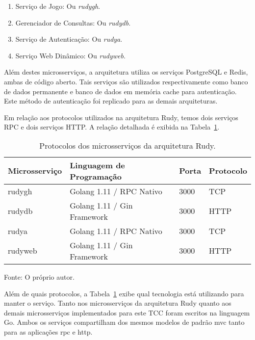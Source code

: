 \begin{enumerate}
    \item Serviço de Jogo: Ou \textit{rudygh}.
    \item Gerenciador de Consultas: Ou \textit{rudydb}.
    \item Serviço de Autenticação: Ou \textit{rudya}.
    \item Serviço Web Dinâmico: Ou \textit{rudyweb}.
\end{enumerate}



Além destes microsserviços, a arquitetura utiliza os serviços PostgreSQL e Redis, ambas de código aberto.
%
Tais serviços são utilizados respectivamente como banco de dados permanente e banco de dados em memória cache para autenticação.
%
Este método de autenticação foi replicado para as demais arquiteturas.



Em relação aos protocolos utilizados na arquitetura Rudy, temos dois serviços RPC e dois serviços HTTP.
%
A relação detalhada é exibida na Tabela~\ref{tab:protocolos_rudy}.



\begin{table}[htb!]
    \centering
    \caption{Protocolos dos microsserviços da arquitetura Rudy.}
    \label{tab:protocolos_rudy}
    \begin{tabular}{|l|l|l|l|}
    \hline
    Microsserviço & Linguagem de Programação    & Porta & Protocolo \\ \hline
    rudygh        & Golang 1.11 / RPC Nativo    & 3000  & TCP       \\ \hline
    rudydb        & Golang 1.11 / Gin Framework & 3000  & HTTP      \\ \hline
    rudya         & Golang 1.11 / RPC Nativo    & 3000  & TCP       \\ \hline
    rudyweb       & Golang 1.11 / Gin Framework & 3000  & HTTP      \\ \hline
    \end{tabular}
    
    Fonte: O próprio autor.
\end{table}

Além de quais protocolos, a Tabela~\ref{tab:protocolos_rudy} exibe qual tecnologia está utilizando para manter o serviço.
%
Tanto nos microsserviços da arquitetura Rudy quanto aos demais microsserviços implementados para este TCC foram escritos na linguagem Go.
%
Ambos os serviços compartilham dos mesmos modelos de padrão \ac{mvc} tanto para as aplicações \ac{rpc} e \ac{http}.

